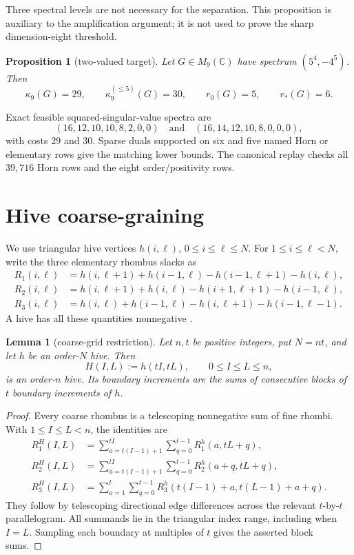 \documentclass[11pt]{article}
\newtheorem{proposition}[theorem]{Proposition}
\newtheorem{lemma}[theorem]{Lemma}
\begin{document}
Three spectral levels are not necessary for the separation.
This proposition is auxiliary to the amplification argument; it is not used
to prove the sharp dimension-eight threshold.

\begin{proposition}[two-valued target]\label{prop:d9}
Let $G\in M_9(\mathbb C)$ have spectrum $(5^4,-4^5)$.  Then
\[
 \kappa_9(G)=29,\qquad \kappa_9^{(\le5)}(G)=30,
 \qquad r_0(G)=5,\qquad r_*(G)=6.
\]
\end{proposition}

Exact feasible squared-singular-value spectra are
\[
 (16,12,10,10,8,2,0,0)\quad\text{and}\quad
 (16,14,12,10,8,0,0,0),
\]
with costs $29$ and $30$.  Sparse duals supported on six and five named Horn
or elementary rows give the matching lower bounds.  The canonical replay
checks all $39{,}716$ Horn rows and the eight order/positivity rows.

\section{Hive coarse-graining}

We use triangular hive vertices $h(i,\ell)$, $0\le i\le\ell\le N$.  For
$1\le i\le\ell<N$, write the three elementary rhombus slacks as
\begin{align*}
 R_1(i,\ell)&=h(i,\ell+1)+h(i-1,\ell)-h(i-1,\ell+1)-h(i,\ell),\\
 R_2(i,\ell)&=h(i,\ell+1)+h(i,\ell)-h(i+1,\ell+1)-h(i-1,\ell),\\
 R_3(i,\ell)&=h(i,\ell)+h(i-1,\ell)-h(i,\ell+1)-h(i-1,\ell-1).
\end{align*}
A hive has all these quantities nonnegative \cite{knutson1999,ktw2004}.

\begin{lemma}[coarse-grid restriction]\label{lem:coarse}
Let $n,t$ be positive integers, put $N=nt$, and let $h$ be an order-$N$
hive.  Then
\[
 H(I,L):=h(tI,tL),\qquad0\le I\le L\le n,
\]
is an order-$n$ hive.  Its boundary increments are the sums of consecutive
blocks of $t$ boundary increments of $h$.
\end{lemma}

\begin{proof}
Every coarse rhombus is a telescoping nonnegative sum of fine rhombi.  With
$1\le I\le L<n$, the identities are
\begin{align*}
 R_1^H(I,L)
 &=\sum_{a=t(I-1)+1}^{tI}\sum_{q=0}^{t-1}R_1^h(a,tL+q),\\
 R_2^H(I,L)
 &=\sum_{a=t(I-1)+1}^{tI}\sum_{q=0}^{t-1}R_2^h(a+q,tL+q),\\
 R_3^H(I,L)
 &=\sum_{a=1}^{t}\sum_{q=0}^{t-1}
 R_3^h(t(I-1)+a,t(L-1)+a+q).
\end{align*}
They follow by telescoping directional edge differences across the relevant
$t$-by-$t$ parallelogram.  All summands lie in the triangular index range,
including when $I=L$.  Sampling each boundary at multiples of $t$ gives the
asserted block sums.
\end{proof}
\end{document}
